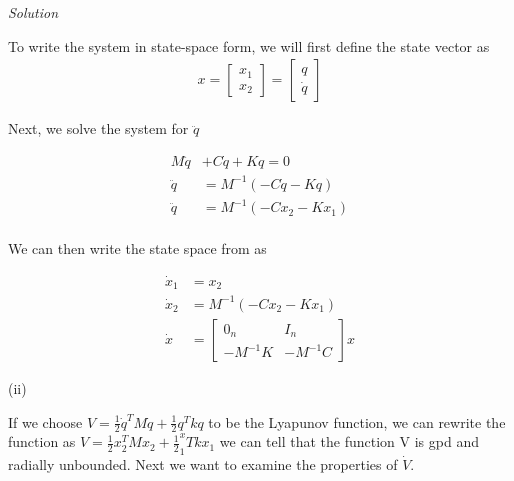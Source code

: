 \documentclass{article}
\begin{document}
  \noindent \textit{Solution} \newline \newline

  To write the system in state-space form, we will first define the state vector
  as
  \begin{align*}
    x = \begin{bmatrix}
      x_1 \\
      x_2
    \end{bmatrix} =
    \begin{bmatrix}
      q \\
      \dot{q}
    \end{bmatrix}
  \end{align*}

  Next, we solve the system for $\ddot{q}$

  \begin{align*}
    M\ddot{q} &+ C\dot{q} + Kq = 0 \\
    \ddot{q} &= M^{-1}(-C\dot{q}-Kq) \\
    \ddot{q} &= M^{-1}(-Cx_2-Kx_1) \\
  \end{align*}

  We can then write the state space from as

  \begin{align*}
    \dot{x}_1 &= x_2 \\
    \dot{x}_2 &= M^{-1}(-Cx_2-Kx_1) \\
    \dot{x} &=
    \begin{bmatrix}
      0_n & I_n \\
      -M^{-1}K & -M^{-1}C
    \end{bmatrix} x
  \end{align*}
  
  \newpage

  (ii) 

  If we choose $V = \frac{1}{2}\dot{q}^TM\dot{q} + \frac{1}{2}q^Tkq$ to be the
  Lyapunov function, we can rewrite the function as $V = \frac{1}{2}x_2^TMx_2 +
  \frac{1}{2}^x_1Tkx_1$  we can tell that the function V is gpd and radially
  unbounded. Next we want to examine the properties of $\dot{V}$.
\end{document}
